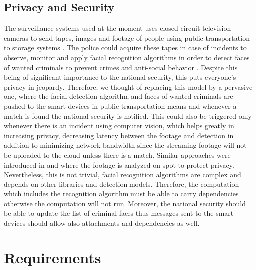 \subsection{Privacy and Security}
The surveillance systems used at the moment uses closed-circuit television cameras to send  tapes, images and footage of people using public transportation to  storage systems \cite{Ashby2017} . The police could acquire  these tapes in case of incidents  to  observe, monitor and  apply facial recognition algorithms in order to  detect faces of wanted criminals  to prevent crimes and anti-social behavior \cite{cctv}. Despite this being of  significant importance to the national security, this puts everyone's privacy in jeopardy. Therefore, we thought of replacing this model by a pervasive one, where  the facial detection algorithm and faces of  wanted criminals are pushed to the smart devices in public transportation means and whenever a match is found the national security is notified. This could also be  triggered only whenever there is an incident using computer vision, which helps greatly in increasing privacy, decreasing  latency between the footage and detection in addition to minimizing network bandwidth since the streaming footage  will not be uploaded to the cloud unless there is a match. Similar approaches were introduced in \cite{4653063} and \cite{winkler2010trustcam} where the footage is analyzed on spot to protect privacy. Nevertheless, this is not trivial, facial recognition algorithms are complex and depends on other libraries and  detection models. Therefore, the computation which includes the recognition algorithm  must be able to carry dependencies otherwise the computation will not run. Moreover, the national security should be able to update the list of criminal faces thus messages sent to the smart devices should allow also attachments and dependencies as well. 


\section{Requirements} \label{sec:requirements}

